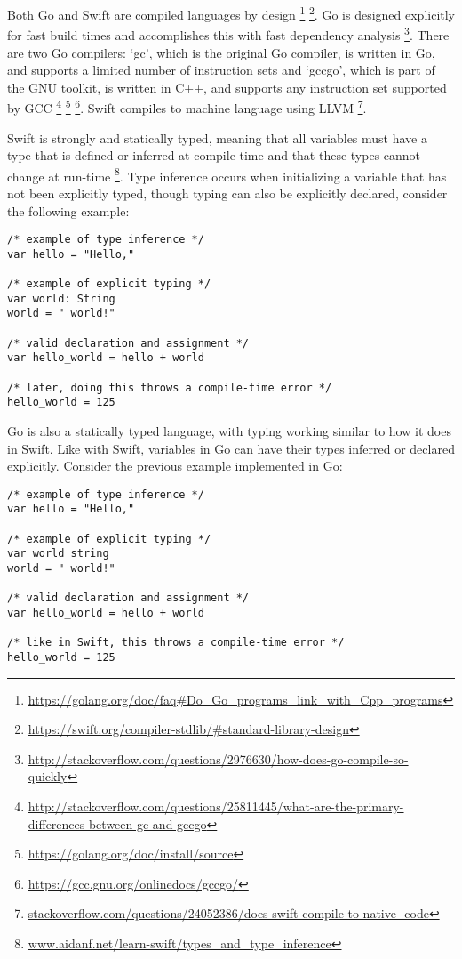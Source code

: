 \documentclass[letterpaper]{article}
\begin{document}
Both Go and Swift are compiled languages by design \footnote{\url{https://golang.org/doc/faq#Do_Go_programs_link_with_Cpp_programs}} \footnote{\url{https://swift.org/compiler-stdlib/#standard-library-design}}. Go is designed explicitly for fast build times and accomplishes this with fast dependency analysis \footnote{\url{http://stackoverflow.com/questions/2976630/how-does-go-compile-so-quickly}}. There are two Go compilers: `gc', which is the original Go compiler, is written in Go, and supports a limited number of instruction sets and `gccgo', which is part of the GNU toolkit, is written in C++, and supports any instruction set supported by GCC \footnote{\url{http://stackoverflow.com/questions/25811445/what-are-the-primary-differences-between-gc-and-gccgo}} \footnote{\url{https://golang.org/doc/install/source}} \footnote{\url{https://gcc.gnu.org/onlinedocs/gccgo/}}. Swift compiles to machine language using LLVM \footnote{\url{stackoverflow.com/questions/24052386/does-swift-compile-to-native-
code}}.

Swift is strongly and statically typed, meaning that all variables must have a type that is defined or inferred at compile-time and that these types cannot change at run-time \footnote{\url{www.aidanf.net/learn-swift/types_and_type_inference}}. Type inference occurs when initializing a variable that has not been explicitly typed, though typing can also be explicitly declared, consider the following example:

\begin{verbatim}
/* example of type inference */
var hello = "Hello,"

/* example of explicit typing */
var world: String
world = " world!"

/* valid declaration and assignment */
var hello_world = hello + world

/* later, doing this throws a compile-time error */
hello_world = 125
\end{verbatim}

Go is also a statically typed language, with typing working similar to how it does in Swift. Like with Swift, variables in Go can have their types inferred or declared explicitly. Consider the previous example implemented in Go:

\begin{verbatim}
/* example of type inference */ 
var hello = "Hello,"

/* example of explicit typing */
var world string
world = " world!"

/* valid declaration and assignment */
var hello_world = hello + world

/* like in Swift, this throws a compile-time error */
hello_world = 125
\end{verbatim}
\end{document}
